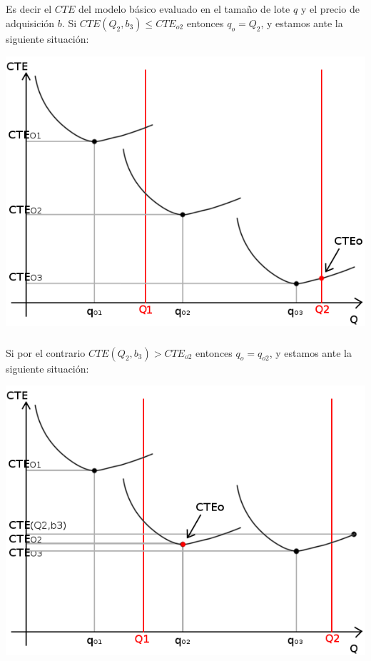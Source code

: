 \documentclass[a4paper,10pt]{article}
\begin{document}
	\subparagraph{} Es decir el $CTE$ del modelo básico evaluado en el tamaño de lote $q$ y el precio de adquisición $b$. Si $CTE(Q_2, b_3) \leq CTE_{o2}$ entonces $q_o = Q_2$, y estamos ante la siguiente situación:

	\begin{center}
	\includegraphics[scale=0.4,keepaspectratio=true]{img/6/6_CTE_Q2.png} 
	\end{center}

	\subparagraph{} Si por el contrario $CTE(Q_2, b_3) > CTE_{o2}$ entonces $q_o = q_{o2}$, y estamos ante la siguiente situación:

	\begin{center}
	\includegraphics[scale=0.4,keepaspectratio=true]{img/6/6_CTE_2.png} 
	\end{center}
\end{document}

